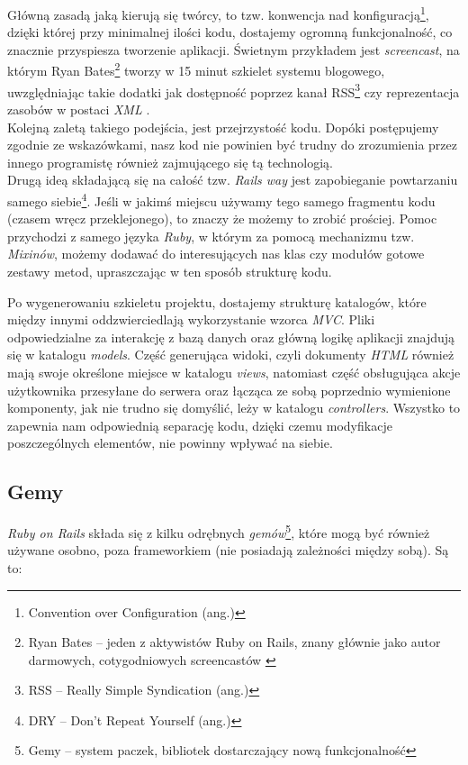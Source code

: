 \documentclass[12pt,twoside]{report}
\begin{document}
Główną zasadą jaką kierują się twórcy, to tzw. konwencja nad
konfiguracją\footnote{Convention over Configuration (ang.)}, dzięki której przy minimalnej
ilości kodu, dostajemy ogromną funkcjonalność, co znacznie przyspiesza tworzenie
aplikacji. Świetnym przykładem jest \emph{screencast}, na którym Ryan
Bates\footnote{Ryan Bates -- jeden z aktywistów Ruby on Rails, znany głównie jako autor
darmowych, cotygodniowych screencastów \cite{ryan-bates}} tworzy w 15 minut szkielet
systemu blogowego, uwzględniając takie dodatki jak dostępność poprzez kanał
RSS\footnote{RSS -- Really Simple Syndication (ang.)} czy reprezentacja zasobów w postaci
\emph{XML} \cite{blog-in-15-min}.\\
Kolejną zaletą takiego podejścia, jest przejrzystość kodu. Dopóki postępujemy zgodnie ze
wskazówkami, nasz kod nie powinien być trudny do zrozumienia przez innego programistę
również zajmującego się tą technologią.\\
Drugą ideą składającą się na całość tzw. \emph{Rails way} jest zapobieganie powtarzaniu
samego siebie\footnote{DRY -- Don't Repeat Yourself (ang.)}. Jeśli w jakimś miejscu używamy
tego samego fragmentu kodu (czasem wręcz przeklejonego), to znaczy że możemy to zrobić
prościej. Pomoc przychodzi z samego języka \emph{Ruby}, w którym za pomocą mechanizmu
tzw. \emph{Mixinów}, możemy dodawać do interesujących nas klas czy modułów gotowe zestawy
metod, upraszczając w ten sposób strukturę kodu.


Po wygenerowaniu szkieletu projektu, dostajemy strukturę katalogów, które między innymi
oddzwierciedlają wykorzystanie wzorca \emph{MVC}. Pliki odpowiedzialne za interakcję z
bazą danych oraz główną logikę aplikacji znajdują się w katalogu \emph{models}. Część
generująca widoki, czyli dokumenty \emph{HTML} również mają swoje określone miejsce w
katalogu \emph{views}, natomiast część obsługująca akcje użytkownika przesyłane do serwera
oraz łącząca ze sobą poprzednio wymienione komponenty, jak nie trudno się domyślić, leży w
katalogu \emph{controllers}. Wszystko to zapewnia nam odpowiednią separację kodu, dzięki
czemu modyfikacje poszczególnych elementów, nie powinny wpływać na siebie.


\subsection{Gemy}
\emph{Ruby on Rails} składa się z kilku odrębnych \emph{gemów}\footnote{Gemy -- system
paczek, bibliotek dostarczający nową funkcjonalność}, które mogą być również używane
osobno, poza frameworkiem (nie posiadają zależności między sobą). Są to:
\end{document}
